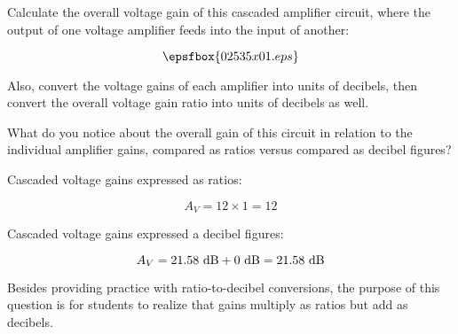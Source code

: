 

Calculate the overall voltage gain of this cascaded amplifier circuit, where the output of one voltage amplifier feeds into the input of another:

$$\epsfbox{02535x01.eps}$$

Also, convert the voltage gains of each amplifier into units of decibels, then convert the overall voltage gain ratio into units of decibels as well.

What do you notice about the overall gain of this circuit in relation to the individual amplifier gains, compared as ratios versus compared as decibel figures?







Cascaded voltage gains expressed as ratios:

$$A_{V} = 12 \times 1 = 12$$

Cascaded voltage gains expressed a decibel figures:

$$A_{V} = 21.58 \hbox{ dB} + 0 \hbox{ dB} = 21.58 \hbox{ dB}$$







Besides providing practice with ratio-to-decibel conversions, the purpose of this question is for students to realize that gains multiply as ratios but add as decibels.




